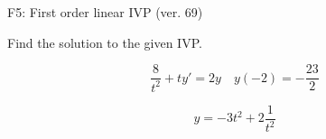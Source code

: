 \begin{exercise}
  \begin{exerciseTitle}F5: First order linear IVP (ver. 69)\end{exerciseTitle}
  \begin{exerciseStatement}
    
Find the solution to the given IVP.

    
\[\frac{8}{t^{2}} +ty'= 2 y \hspace{1em} y( -2 ) = -\frac{23}{2}\]

  \end{exerciseStatement}
  \begin{exerciseAnswer}
    
\[y= -3 t^ 2 +2 \frac{1}{t^{2}}\]

  \end{exerciseAnswer}
\end{exercise}